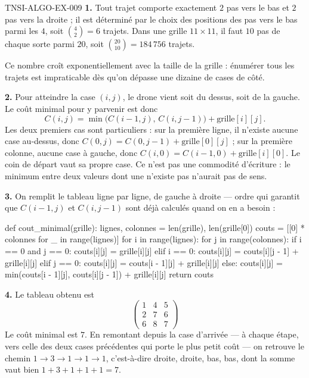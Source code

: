\begin{corrige}{TNSI-ALGO-EX-009}
\textbf{1.} Tout trajet comporte exactement $2$ pas vers le bas et $2$ pas vers
la droite ; il est déterminé par le choix des positions des pas vers le bas parmi
les $4$, soit $\binom{4}{2}=6$ trajets. Dans une grille $11\times 11$, il faut
$10$ pas de chaque sorte parmi $20$, soit $\binom{20}{10}=184\,756$ trajets.

Ce nombre croît exponentiellement avec la taille de la grille : énumérer tous les
trajets est impraticable dès qu'on dépasse une dizaine de cases de côté.

\textbf{2.} Pour atteindre la case $(i,j)$, le drone vient soit du dessus, soit
de la gauche. Le coût minimal pour y parvenir est donc
\[
  C(i,j)=\min\big(C(i-1,j),\,C(i,j-1)\big)+\text{grille}[i][j].
\]
Les deux premiers cas sont particuliers : sur la première ligne, il n'existe
aucune case au-dessus, donc $C(0,j)=C(0,j-1)+\text{grille}[0][j]$ ; sur la
première colonne, aucune case à gauche, donc
$C(i,0)=C(i-1,0)+\text{grille}[i][0]$. Le coin de départ vaut sa propre case. Ce
n'est pas une commodité d'écriture : le minimum entre deux valeurs dont une
n'existe pas n'aurait pas de sens.

\textbf{3.} On remplit le tableau ligne par ligne, de gauche à droite — ordre qui
garantit que $C(i-1,j)$ et $C(i,j-1)$ sont déjà calculés quand on en a besoin :
\begin{python}
def cout_minimal(grille):
    lignes, colonnes = len(grille), len(grille[0])
    couts = [[0] * colonnes for _ in range(lignes)]
    for i in range(lignes):
        for j in range(colonnes):
            if i == 0 and j == 0:
                couts[i][j] = grille[i][j]
            elif i == 0:
                couts[i][j] = couts[i][j - 1] + grille[i][j]
            elif j == 0:
                couts[i][j] = couts[i - 1][j] + grille[i][j]
            else:
                couts[i][j] = min(couts[i - 1][j], couts[i][j - 1]) + grille[i][j]
    return couts
\end{python}

\textbf{4.} Le tableau obtenu est
\[
  \begin{pmatrix}1&4&5\\2&7&6\\6&8&7\end{pmatrix}
\]
Le coût minimal est $7$. En remontant depuis la case d'arrivée — à chaque étape,
vers celle des deux cases précédentes qui porte le plus petit coût — on retrouve
le chemin $1\to 3\to 1\to 1\to 1$, c'est-à-dire droite, droite, bas, bas, dont la
somme vaut bien $1+3+1+1+1=7$.


\end{corrige}
